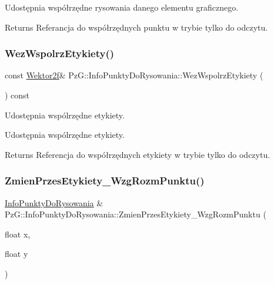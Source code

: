 Udostępnia współrzędne rysowania danego elementu graficznego. \begin{DoxyReturn}{Returns}
Referancja do współrzędnych punktu w trybie tylko do odczytu. 
\end{DoxyReturn}
\mbox{\label{class_pz_g_1_1_info_punkty_do_rysowania_a8903b837a2c97c8aede88324d316ac6e}} 
\subsubsection{\texorpdfstring{WezWspolrzEtykiety()}{WezWspolrzEtykiety()}}
{\footnotesize\ttfamily const \mbox{\hyperlink{class_pz_g_1_1_wektor2f}{Wektor2f}}\& Pz\+G\+::\+Info\+Punkty\+Do\+Rysowania\+::\+Wez\+Wspolrz\+Etykiety (\begin{DoxyParamCaption}{ }\end{DoxyParamCaption}) const\hspace{0.3cm}{\ttfamily [inline]}}



Udostępnia wspólrzędne etykiety. 

Udostępnia wspólrzędne etykiety. \begin{DoxyReturn}{Returns}
Referencja do współrzędnych etykiety w trybie tylko do odczytu. 
\end{DoxyReturn}
\mbox{\label{class_pz_g_1_1_info_punkty_do_rysowania_af2b7bd8684f0b4a4b5465c16e0fe6c71}} 
\subsubsection{\texorpdfstring{ZmienPrzesEtykiety\_WzgRozmPunktu()}{ZmienPrzesEtykiety\_WzgRozmPunktu()}}
{\footnotesize\ttfamily \mbox{\hyperlink{class_pz_g_1_1_info_punkty_do_rysowania}{Info\+Punkty\+Do\+Rysowania}} \& Pz\+G\+::\+Info\+Punkty\+Do\+Rysowania\+::\+Zmien\+Przes\+Etykiety\+\_\+\+Wzg\+Rozm\+Punktu (\begin{DoxyParamCaption}\item[{float}]{x,  }\item[{float}]{y }\end{DoxyParamCaption})}



